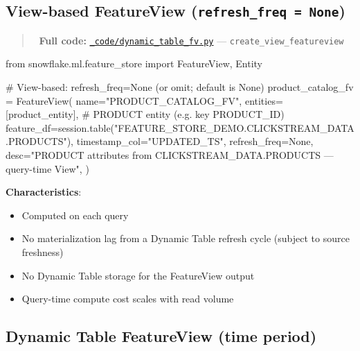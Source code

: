 \documentclass[
  letterpaper,
  DIV=11,
  numbers=noendperiod]{scrreprt}
\newenvironment{Shaded}{\begin{snugshade}}{\end{snugshade}}
\newcommand{\CommentTok}[1]{\textcolor[rgb]{0.37,0.37,0.37}{#1}}
\newcommand{\ImportTok}[1]{\textcolor[rgb]{0.00,0.46,0.62}{#1}}
\newcommand{\NormalTok}[1]{\textcolor[rgb]{0.00,0.23,0.31}{#1}}
\newcommand{\OperatorTok}[1]{\textcolor[rgb]{0.37,0.37,0.37}{#1}}
\newcommand{\StringTok}[1]{\textcolor[rgb]{0.13,0.47,0.30}{#1}}
\newcommand{\VariableTok}[1]{\textcolor[rgb]{0.07,0.07,0.07}{#1}}
\providecommand{\tightlist}{%
  \setlength{\itemsep}{0pt}\setlength{\parskip}{0pt}}\usepackage{longtable,booktabs,array}
\begin{document}
\hypertarget{view-based-featureview-refresh_freq-none}{%
\subsection{\texorpdfstring{View-based FeatureView
(\texttt{refresh\_freq\ =\ None})}{View-based FeatureView (refresh\_freq = None)}}\label{view-based-featureview-refresh_freq-none}}

\begin{quote}
📁 \textbf{Full code:}
\href{_code/dynamic_table_fv.py}{\texttt{\_code/dynamic\_table\_fv.py}}
--- \texttt{create\_view\_featureview}
\end{quote}

\begin{Shaded}
\begin{Highlighting}[]
\ImportTok{from}\NormalTok{ snowflake.ml.feature\_store }\ImportTok{import}\NormalTok{ FeatureView, Entity}

\CommentTok{\# View{-}based: refresh\_freq=None (or omit; default is None)}
\NormalTok{product\_catalog\_fv }\OperatorTok{=}\NormalTok{ FeatureView(}
\NormalTok{    name}\OperatorTok{=}\StringTok{"PRODUCT\_CATALOG\_FV"}\NormalTok{,}
\NormalTok{    entities}\OperatorTok{=}\NormalTok{[product\_entity],  }\CommentTok{\# PRODUCT entity (e.g. key PRODUCT\_ID)}
\NormalTok{    feature\_df}\OperatorTok{=}\NormalTok{session.table(}\StringTok{"FEATURE\_STORE\_DEMO.CLICKSTREAM\_DATA.PRODUCTS"}\NormalTok{),}
\NormalTok{    timestamp\_col}\OperatorTok{=}\StringTok{"UPDATED\_TS"}\NormalTok{,}
\NormalTok{    refresh\_freq}\OperatorTok{=}\VariableTok{None}\NormalTok{,}
\NormalTok{    desc}\OperatorTok{=}\StringTok{"PRODUCT attributes from CLICKSTREAM\_DATA.PRODUCTS — query{-}time View"}\NormalTok{,}
\NormalTok{)}
\end{Highlighting}
\end{Shaded}

\textbf{Characteristics}:

\begin{itemize}
\tightlist
\item
  Computed on each query
\item
  No materialization lag from a Dynamic Table refresh cycle (subject to
  source freshness)
\item
  No Dynamic Table storage for the FeatureView output
\item
  Query-time compute cost scales with read volume
\end{itemize}

\hypertarget{dynamic-table-featureview-time-period}{%
\subsection{Dynamic Table FeatureView (time
period)}\label{dynamic-table-featureview-time-period}}
\end{document}
